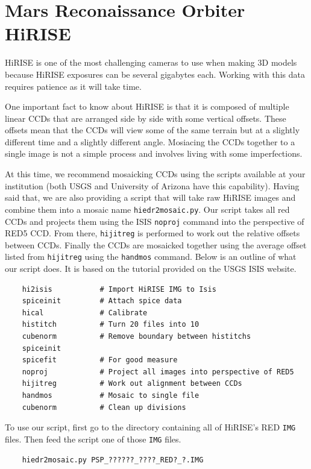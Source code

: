 \section{Mars Reconaissance Orbiter HiRISE}

HiRISE is one of the most challenging cameras to use when making 3D
models because HiRISE exposures can be several gigabytes each. Working
with this data requires patience as it will take time.

One important fact to know about HiRISE is that it is composed of
multiple linear CCDs that are arranged side by side with some vertical
offsets. These offsets mean that the CCDs will view some of the same
terrain but at a slightly different time and a slightly different
angle. Mosiacing the CCDs together to a single image is not a simple
process and involves living with some imperfections.

At this time, we recommend mosaicking CCDs using the scripts available
at your institution (both USGS and University of Arizona have this
capability). Having said that, we are also providing a script that
will take raw HiRISE images and combine them into a mosaic name
\texttt{hiedr2mosaic.py}. Our script takes all red CCDs and projects
them using the ISIS {\tt noproj} command into the perspective of RED5
CCD. From there, {\tt hijitreg} is performed to work out the relative
offsets between CCDs. Finally the CCDs are mosaicked together using
the average offset listed from {\tt hijitreg} using the {\tt handmos}
command. Below is an outline of what our script does.  It is based on
the tutorial provided on the USGS ISIS website.

\begin{verbatim}
    hi2isis           # Import HiRISE IMG to Isis
    spiceinit         # Attach spice data
    hical             # Calibrate
    histitch          # Turn 20 files into 10
    cubenorm          # Remove boundary between histitchs
    spiceinit
    spicefit          # For good measure
    noproj            # Project all images into perspective of RED5
    hijitreg          # Work out alignment between CCDs
    handmos           # Mosaic to single file
    cubenorm          # Clean up divisions
\end{verbatim}

To use our script, first go to the directory containing all of
HiRISE's RED \texttt{IMG} files. Then feed the script one of those
\texttt{IMG} files.

\begin{verbatim}
    hiedr2mosaic.py PSP_??????_????_RED?_?.IMG
\end{verbatim}

